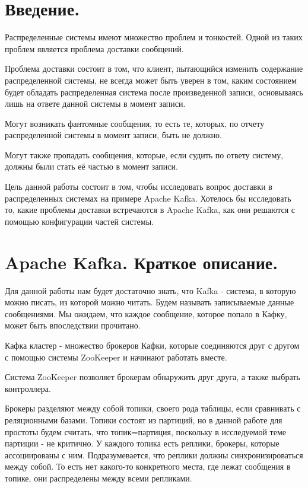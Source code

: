 \documentclass[11pt]{article}
\begin{document}
    \section{Введение.}

    Распределенные системы имеют множество проблем и тонкостей. Одной из таких проблем является проблема доставки
    сообщений.

    Проблема доставки состоит в том, что клиент, пытающийся изменить содержание распределенной системы, не всегда
    может быть уверен в том, каким состоянием будет обладать распределенная система после произведенной записи,
    основываясь лишь на ответе данной системы в момент записи.

    Могут возникать фантомные сообщения, то есть те, которых, по отчету распределенной системы в момент записи, быть
    не должно.

    Могут также пропадать сообщения, которые, если судить по ответу систему, должны были стать её частью в момент
    записи.

    Цель данной работы состоит в том, чтобы исследовать вопрос доставки в распределенных системах на примере Apache
    Kafka. Хотелось бы исследовать то, какие проблемы доставки встречаются в Apache Kafka,
    как они решаются с помощью
    конфигурации частей системы.

    \section{Apache Kafka. Краткое описание.}
    Для данной работы нам будет достаточно знать, что Kafka - система, в которую можно писать, из которой можно
    читать. Будем называть записываемые данные сообщениями. Мы ожидаем, что каждое сообщение, которое попало в Кафку,
    может быть впоследствии прочитано.

    Кафка кластер - множество брокеров Кафки, которые соединяются друг с другом с помощью системы ZooKeeper и
    начинают работать вместе.

    Система ZooKeeper позволяет брокерам обнаружить друг друга, а также выбрать контроллера.

    Брокеры разделяют между собой топики, своего рода таблицы, если сравнивать с реляционными базами. Топики состоят
    из партиций, но в данной работе для простоты будем считать, что топик=партиция, поскольку в исследуемой теме
    партиции - не критично. У каждого топика есть реплики, брокеры, которые ассоциированы с ним. Подразумевается, что
    реплики должны синхронизироваться между собой. То есть нет какого-то конкретного места, где лежат сообщения в
    топике, они распределены между всеми репликами.
\end{document}

